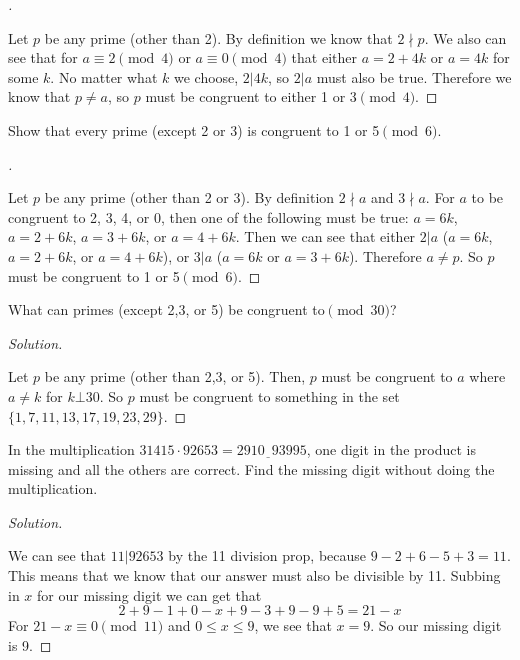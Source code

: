 \documentclass[11pt]{article}
\newcommand{\ndiv}{\nmid}
\newenvironment{myproof}[1][\proofname]{%
  \begin{proof}[#1]$ $\par\nobreak\ignorespaces
}{%
  \end{proof}
}
\newenvironment{problem}[2][Problem]{\begin{trivlist}
\item[\hskip \labelsep {\bfseries #1}\hskip \labelsep {\bfseries #2.}]}{\end{trivlist}}
\newenvironment{solution}
  {\renewcommand\qedsymbol{$~$}\begin{proof}[Solution]$ $\par\nobreak\ignorespaces}
  {\end{proof}}
\begin{document}
\begin{myproof}
    Let $p$ be any prime (other than 2). By definition we know that $2 \ndiv p$. We also can see that for $a\equiv 2\pmod{4}$ or $a\equiv 0\pmod{4}$ that either $a=2 +4k$ or $a=4k$ for some $k$. No matter what $k$ we choose, $2|4k$, so $2|a$ must also be true. Therefore we know that $p\neq a$, so $p$ must be congruent to either 1 or 3$\pmod{4}$.
\end{myproof}


\begin{problem}{9}
Show that every prime (except 2 or 3) is congruent to 1 or 5$\pmod{6}$.
\end{problem}

\begin{myproof}
    Let $p$ be any prime (other than 2 or 3). By definition $2\ndiv a$ and $3\ndiv a$. For $a$ to be congruent to 2, 3, 4, or 0, then one of the following must be true: $a=6k$, $a=2 +6k$, $a=3 +6k$, or $a=4 +6k$.
    Then we can see that either $2|a$ ($a=6k$, $a=2+6k$, or $a=4+6k$), or $3|a$ ($a=6k$ or $a=3+6k$). Therefore $a\neq p$. So $p$ must be congruent to 1 or 5$\pmod{6}$.
\end{myproof}



\begin{problem}{10}
What can primes (except 2,3, or 5) be congruent to$\pmod{30}$?
\end{problem}

\begin{solution}
    Let $p$ be any prime (other than 2,3, or 5). Then, $p$ must be congruent to $a$ where $a\neq k$ for $k\bot 30$. So $p$ must be congruent to something in the set $\{1, 7, 11, 13, 17, 19, 23, 29\}$.
\end{solution}


\begin{problem}{11}
In the multiplication $31415\cdot92653=2910\underline{\phantom{3}}93995$, one digit in the product is missing and all the others are correct. Find the missing digit without doing the multiplication.
\end{problem}

\begin{solution}
    We can see that $11|92653$ by the 11 division prop, because $9-2+6-5+3=11$. This means that we know that our answer must also be divisible by 11.
    Subbing in $x$ for our missing digit we can get that
    \[
        2+9-1+0-x+9-3+9-9+5 = 21-x
    \]
    For $21-x\equiv 0 \pmod{11}$ and $0\leq x\leq 9$, we see that $x=9$.
    So our missing digit is 9.
\end{solution}
\end{document}
